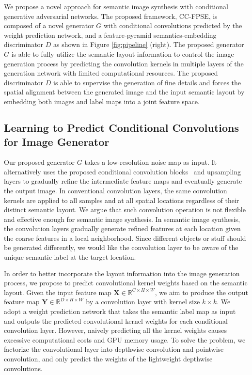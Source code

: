 \documentclass{article}
\begin{document}
We propose a novel approach for semantic image synthesis with conditional generative adversarial networks.
The proposed framework, CC-FPSE, is composed of a novel generator $G$ with conditional convolutions predicted by the weight prediction network, and a feature-pyramid semantics-embedding discriminator $D$ as shown in Figure \ref{fig:pipeline} (right). 
The proposed generator $G$ is able to fully utilize the semantic layout information to control the image generation process by predicting the convolution kernels in multiple layers of the generation network with limited computational resources.
The proposed discriminator $D$ is able to supervise the generation of fine details and forces the spatial alignment between the generated image and the input semantic layout by embedding both images and label maps into a joint feature space.

\subsection{Learning to Predict Conditional Convolutions for Image Generator}
Our proposed generator $G$ takes a low-resolution noise map as input. It alternatively uses the proposed conditional convolution blocks~\cite{he2016deep} and upsampling layers to gradually refine the intermediate feature maps and eventually generate the output image.
In conventional convolution layers, the same convolution kernels are applied to all samples and at all spatial locations regardless of their distinct semantic layout. 
We argue that such convolution operation is not flexible and effective enough for semantic image synthesis.
In semantic image synthesis, the convolution layers gradually generate refined features at each location given the coarse features in a local neighborhood.
Since different objects or stuff should be generated differently, we would like the convolution layer to be aware of the unique semantic label at the target location.


In order to better incorporate the layout information into the image generation process, we propose to predict convolutional kernel weights based on the semantic layout.
Given the input feature map $\mathbf{X}\in \mathbb{R}^{C\times H\times W}$, we aim to produce the output feature map $\mathbf{Y}\in \mathbb{R}^{D\times H\times W}$ by a convolution layer with kernel size $k\times k$.
We adopt a weight prediction network that takes the semantic label map as input and outputs the predicted convolutional kernel weights for each conditional convolution layer.
However, naively predicting all the kernel weights causes excessive computational costs and GPU memory usage.
To solve the problem, we factorize the convolutional layer into depthwise convolution and pointwise convolution, and only predict the weights of the lightweight depthwise convolutions.
\end{document}
